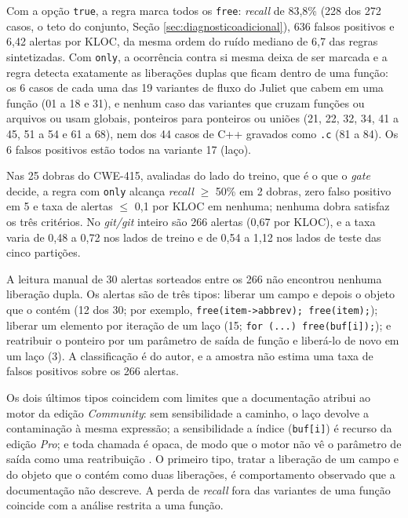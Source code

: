 \documentclass[
    12pt,                %
    openright,           %
    oneside,             %
    a4paper,             %
    english,             %
    brazil               %
]{abntex2}
\newcommand{\novo}[1]{{\color{red}#1}}
\begin{document}
\novo{Com a opção \texttt{true}, a regra marca todos os \texttt{free}: \textit{recall} de 83,8\% (228 dos 272 casos, o teto do conjunto, Seção \ref{sec:diagnosticoadicional}), 636 falsos positivos e 6,42 alertas por KLOC, da mesma ordem do ruído mediano de 6,7 das regras sintetizadas. Com \texttt{only}, a ocorrência contra si mesma deixa de ser marcada e a regra detecta exatamente as liberações duplas que ficam dentro de uma função: os 6 casos de cada uma das 19 variantes de fluxo do Juliet que cabem em uma função (01 a 18 e 31), e nenhum caso das variantes que cruzam funções ou arquivos ou usam globais, ponteiros para ponteiros ou uniões (21, 22, 32, 34, 41 a 45, 51 a 54 e 61 a 68), nem dos 44 casos de C++ gravados como \texttt{.c} (81 a 84). Os 6 falsos positivos estão todos na variante 17 (laço).}
\par
\novo{Nas 25 dobras do CWE-415, avaliadas do lado do treino, que é o que o \textit{gate} decide, a regra com \texttt{only} alcança \textit{recall} $\geq$ 50\% em 2 dobras, zero falso positivo em 5 e taxa de alertas $\leq$ 0,1 por KLOC em nenhuma; nenhuma dobra satisfaz os três critérios. No \textit{git/git} inteiro são 266 alertas (0,67 por KLOC), e a taxa varia de 0,48 a 0,72 nos lados de treino e de 0,54 a 1,12 nos lados de teste das cinco partições.}
\par
\novo{A leitura manual de 30 alertas sorteados entre os 266 não encontrou nenhuma liberação dupla. Os alertas são de três tipos: liberar um campo e depois o objeto que o contém (12 dos 30; por exemplo, \texttt{free(item->abbrev); free(item);}); liberar um elemento por iteração de um laço (15; \texttt{for (...) free(buf[i]);}); e reatribuir o ponteiro por um parâmetro de saída de função e liberá-lo de novo em um laço (3). A classificação é do autor, e a amostra não estima uma taxa de falsos positivos sobre os 266 alertas.}
\par
\novo{Os dois últimos tipos coincidem com limites que a documentação atribui ao motor da edição \textit{Community}: sem sensibilidade a caminho, o laço devolve a contaminação à mesma expressão; a sensibilidade a índice (\texttt{buf[i]}) é recurso da edição \textit{Pro}; e toda chamada é opaca, de modo que o motor não vê o parâmetro de saída como uma reatribuição \cite{semgrep2026dataflow, semgrep2026taintavancado}. O primeiro tipo, tratar a liberação de um campo e do objeto que o contém como duas liberações, é comportamento observado que a documentação não descreve. A perda de \textit{recall} fora das variantes de uma função coincide com a análise restrita a uma função.}
\end{document}
